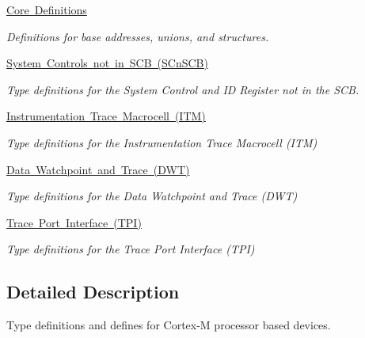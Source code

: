 \begin{DoxyCompactItemize}
\mbox{\hyperlink{group___c_m_s_i_s__core__base}{Core Definitions}}
\begin{DoxyCompactList}\small\item\em Definitions for base addresses, unions, and structures. \end{DoxyCompactList}\item 
\mbox{\hyperlink{group___c_m_s_i_s___s_cn_s_c_b}{System Controls not in S\+C\+B (\+S\+Cn\+S\+C\+B)}}
\begin{DoxyCompactList}\small\item\em Type definitions for the System Control and ID Register not in the S\+CB. \end{DoxyCompactList}\item 
\mbox{\hyperlink{group___c_m_s_i_s___i_t_m}{Instrumentation Trace Macrocell (\+I\+T\+M)}}
\begin{DoxyCompactList}\small\item\em Type definitions for the Instrumentation Trace Macrocell (I\+TM) \end{DoxyCompactList}\item 
\mbox{\hyperlink{group___c_m_s_i_s___d_w_t}{Data Watchpoint and Trace (\+D\+W\+T)}}
\begin{DoxyCompactList}\small\item\em Type definitions for the Data Watchpoint and Trace (D\+WT) \end{DoxyCompactList}\item 
\mbox{\hyperlink{group___c_m_s_i_s___t_p_i}{Trace Port Interface (\+T\+P\+I)}}
\begin{DoxyCompactList}\small\item\em Type definitions for the Trace Port Interface (T\+PI) \end{DoxyCompactList}\end{DoxyCompactItemize}


\subsection{Detailed Description}
Type definitions and defines for Cortex-\/M processor based devices. 


